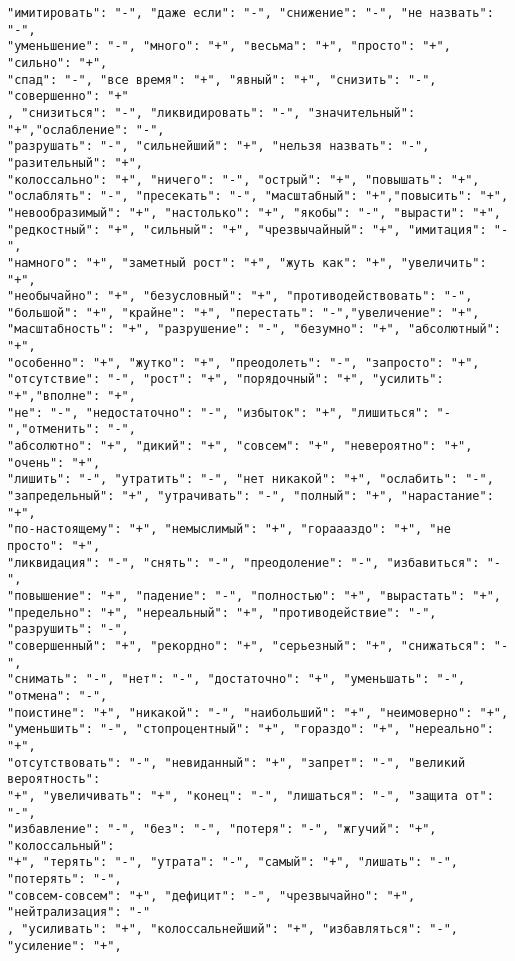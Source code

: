 

\begin{lstlisting}[caption="Словосочетания используемые для составления тональных префиксов", label={lst:tonePrefixes}]
"имитировать": "-", "даже если": "-", "снижение": "-", "не назвать": "-",
"уменьшение": "-", "много": "+", "весьма": "+", "просто": "+", "сильно": "+",
"спад": "-", "все время": "+", "явный": "+", "снизить": "-", "совершенно": "+"
, "снизиться": "-", "ликвидировать": "-", "значительный": "+","ослабление": "-",
"разрушать": "-", "сильнейший": "+", "нельзя назвать": "-", "разительный": "+",
"колоссально": "+", "ничего": "-", "острый": "+", "повышать": "+",
"ослаблять": "-", "пресекать": "-", "масштабный": "+","повысить": "+",
"невообразимый": "+", "настолько": "+", "якобы": "-", "вырасти": "+",
"редкостный": "+", "сильный": "+", "чрезвычайный": "+", "имитация": "-",
"намного": "+", "заметный рост": "+", "жуть как": "+", "увеличить": "+",
"необычайно": "+", "безусловный": "+", "противодействовать": "-",
"большой": "+", "крайне": "+", "перестать": "-","увеличение": "+",
"масштабность": "+", "разрушение": "-", "безумно": "+", "абсолютный": "+",
"особенно": "+", "жутко": "+", "преодолеть": "-", "запросто": "+",
"отсутствие": "-", "рост": "+", "порядочный": "+", "усилить": "+","вполне": "+",
"не": "-", "недостаточно": "-", "избыток": "+", "лишиться": "-","отменить": "-",
"абсолютно": "+", "дикий": "+", "совсем": "+", "невероятно": "+", "очень": "+",
"лишить": "-", "утратить": "-", "нет никакой": "+", "ослабить": "-",
"запредельный": "+", "утрачивать": "-", "полный": "+", "нарастание": "+",
"по-настоящему": "+", "немыслимый": "+", "гораааздо": "+", "не просто": "+",
"ликвидация": "-", "снять": "-", "преодоление": "-", "избавиться": "-",
"повышение": "+", "падение": "-", "полностью": "+", "вырастать": "+",
"предельно": "+", "нереальный": "+", "противодействие": "-", "разрушить": "-",
"совершенный": "+", "рекордно": "+", "серьезный": "+", "снижаться": "-",
"снимать": "-", "нет": "-", "достаточно": "+", "уменьшать": "-", "отмена": "-",
"поистине": "+", "никакой": "-", "наибольший": "+", "неимоверно": "+",
"уменьшить": "-", "стопроцентный": "+", "гораздо": "+", "нереально": "+",
"отсутствовать": "-", "невиданный": "+", "запрет": "-", "великий вероятность":
"+", "увеличивать": "+", "конец": "-", "лишаться": "-", "защита от": "-",
"избавление": "-", "без": "-", "потеря": "-", "жгучий": "+", "колоссальный":
"+", "терять": "-", "утрата": "-", "самый": "+", "лишать": "-", "потерять": "-",
"совсем-совсем": "+", "дефицит": "-", "чрезвычайно": "+", "нейтрализация": "-"
, "усиливать": "+", "колоссальнейший": "+", "избавляться": "-", "усиление": "+",
\end{lstlisting}
